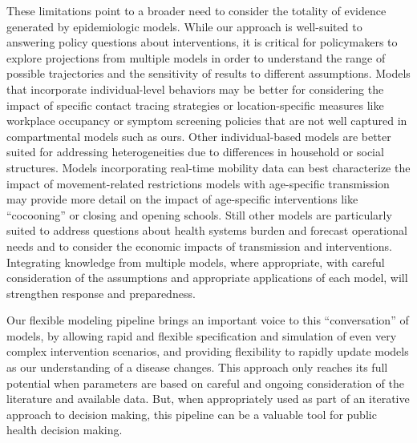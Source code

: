 These limitations point to a broader need to consider the totality of evidence generated by epidemiologic models. While our approach is well-suited to answering policy questions about interventions, it is critical for policymakers to explore projections from multiple models in order to understand the range of possible trajectories and the sensitivity of results to different assumptions. Models that incorporate individual-level behaviors may be better for considering the impact of specific contact tracing strategies or location-specific measures like workplace occupancy or symptom screening policies that are not well captured in compartmental models such as ours\cite{Kucharski:EffectivenessIsolationTesting:2020,Firth:UsingRealworldNetwork:2020,Hinch:OpenABMCovid19AgentbasedModel:2020}. Other individual-based models are better suited for addressing heterogeneities due to differences in household or social structures\cite{Wilder:ModelingBetweenpopulationVariation:2020,Kerr:CovasimAgentbasedModel:2021}. Models incorporating real-time mobility data can best characterize the impact of movement-related restrictions\cite{Lai:EffectNonpharmaceuticalInterventions:2020} models with age-specific transmission may provide more detail on the impact of age-specific interventions like “cocooning”\cite{Duque:COVID19HowRelax:2020} or closing and opening schools\cite{Ferguson:ReportImpactNonpharmaceutical:2020}. Still other models are particularly suited to address questions about health systems burden and forecast operational needs\cite{Branas:FlatteningCurveIt:2020,LosAlamosNationalLaboratory:COVID19CasesDeaths,Weissman:LocallyInformedSimulation:2020} and to consider the economic impacts of transmission and interventions\cite{Acemoglu:OptimalTargetedLockdowns:2020,Silva:COVIDABSAgentbasedModel:2020}. Integrating knowledge from multiple models, where appropriate, with careful consideration of the assumptions and appropriate applications of each model, will strengthen response and preparedness\cite{Shea:HarnessingMultipleModels:2020}.


Our flexible modeling pipeline brings an important voice to this “conversation” of models, by allowing rapid and flexible specification and simulation of even very complex intervention scenarios, and providing flexibility to rapidly update models as our understanding of a disease changes. This approach only reaches its full potential when parameters are based on careful and ongoing consideration of the literature and available data. But, when appropriately used as part of an iterative approach to decision making, this pipeline can be a valuable tool for public health decision making.

